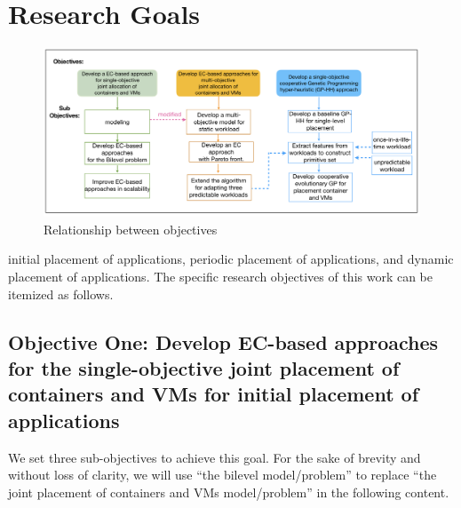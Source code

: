 \section{Research Goals}

\begin{figure}
	\centering
	\includegraphics[width=\textwidth]{pics/thesisPlan.png}
	\caption{Relationship between objectives}
	\label{fig:objectives}
\end{figure}
 initial placement of applications, periodic placement of applications, and dynamic placement of applications. The specific research objectives of this work can be itemized as follows.


\subsection{Objective One: Develop EC-based approaches for the single-objective joint placement of containers and VMs for initial placement of applications}
\label{sec:obj1}

 We set three sub-objectives to achieve this goal. 
For the sake of brevity and without loss of clarity, we will use ``the bilevel model/problem'' to replace ``the joint placement of containers and VMs model/problem'' in the following content. 

